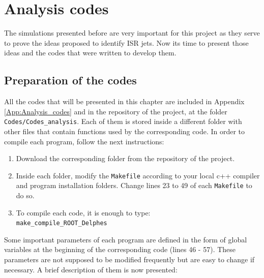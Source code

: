 \documentclass[12pt, oneside]{book}              %
\begin{document}
\chapter{Analysis codes}\label{cha:Analysis_codes}

The simulations presented before are very important for this project 
as they serve to prove the ideas proposed to identify ISR jets. 
Now its time to present those ideas and the codes that were written
to develop them.

\section[Preparation of the codes]{Preparation of the codes} \label{sec:Preparation_codes}

All the codes that will be presented in this chapter are included in Appendix \ref{App:Analysis_codes}
and in the repository of the project, at the folder \texttt{Codes/Codes\_analysis}.
Each of them is stored inside a different folder with other files that contain
functions used by the corresponding code. In order to compile each program, follow 
the next instructions:

\begin{enumerate}
\item Download the corresponding folder from the repository of the project.
\item Inside each folder, modify the \texttt{Makefile} according to your local
c++ compiler and program installation folders. Change lines 23 to 49 of each 
\texttt{Makefile} to do so.
\item To compile each code, it is enough to type:
\\ \texttt{make\_compile\_ROOT\_Delphes}
\end{enumerate}

Some important parameters of each program are defined in the form of global variables 
at the beginning of the corresponding code (lines 46 - 57). These parameters 
are not supposed to be modified frequently but are easy to change if necessary. A brief
description of them is now presented:
\end{document}

